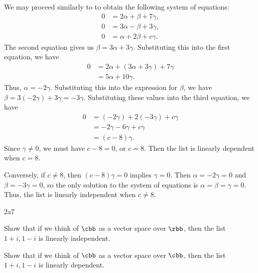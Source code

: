 \begin{sol}
    We may proceed similarly to  to obtain the following system of equations:
    \begin{align*}
        0 & = 2\alpha + \beta + 7\gamma, \\
        0 & = 3\alpha - \beta + 3\gamma, \\
        0 & = \alpha + 2\beta + c\gamma.
    \end{align*}
    The second equation gives us $\beta = 3\alpha + 3\gamma$.
	Substituting this into the first equation, we have
    \begin{align*}
        0 & = 2\alpha + (3\alpha + 3\gamma) + 7\gamma \\
        & = 5\alpha + 10\gamma.
    \end{align*}
    Thus, $\alpha = -2\gamma$.
	Substituting this into the expression for $\beta$, we have $\beta = 3(-2\gamma) + 3\gamma = -3\gamma$.
	Substituting these values into the third equation, we have
    \begin{align*}
        0 & = (-2\gamma) + 2(-3\gamma) + c\gamma \\
        & = -2\gamma - 6\gamma + c\gamma \\
        & = (c - 8)\gamma.
    \end{align*}
    Since $\gamma \neq 0$, we must have $c - 8 = 0$, or $c = 8$.
	Then the list is linearly dependent when $c = 8$.

    Conversely, if $c \neq 8$, then $(c - 8)\gamma = 0$ implies $\gamma = 0$.
	Then $\alpha = -2\gamma = 0$ and $\beta = -3\gamma = 0$, so the only solution to the system of equations is $\alpha = \beta = \gamma = 0$.
	Thus, the list is linearly independent when $c \neq 8$.
\end{sol}
 
\begin{exercise}{2a7}
    \begin{subexercises}
        \item Show that if we think of $\cbb$ as a vector space over $\rbb$, then the list $1 + i, 1 - i$ is linearly independent.
        \item Show that if we think of $\cbb$ as a vector space over $\cbb$, then the list $1 + i, 1 - i$ is linearly dependent.
    \end{subexercises}
\end{exercise}

